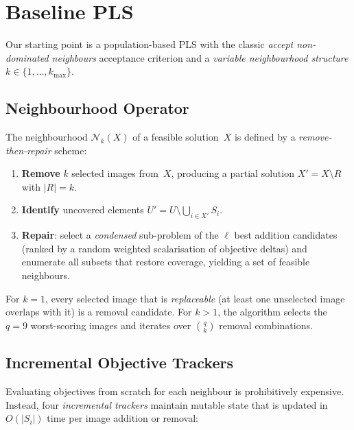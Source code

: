 \documentclass[11pt,a4paper]{article}
\newcommand{\calN}{\mathcal{N}}
\begin{document}
\section{Baseline PLS}\label{sec:pls_baseline}

Our starting point is a population-based PLS with the classic
\emph{accept non-dominated neighbours} acceptance criterion and a
\emph{variable neighbourhood structure} $k \in \{1,\ldots,k_{\max}\}$.

\subsection{Neighbourhood Operator}\label{sec:neighbourhood}

The neighbourhood $\calN_k(X)$ of a feasible solution~$X$ is defined by
a \emph{remove-then-repair} scheme:

\begin{enumerate}[nosep]
  \item \textbf{Remove} $k$ selected images from~$X$, producing a
    partial solution $X' = X \setminus R$ with $|R|=k$.
  \item \textbf{Identify} uncovered elements
    $U' = U \setminus \bigcup_{i \in X'} S_i$.
  \item \textbf{Repair}: select a \emph{condensed} sub-problem of the
    $\ell$ best addition candidates (ranked by a random weighted
    scalarisation of objective deltas) and enumerate all subsets that
    restore coverage, yielding a set of feasible neighbours.
\end{enumerate}

For $k{=}1$, every selected image that is \emph{replaceable} (at least
one unselected image overlaps with it) is a removal candidate.  For
$k{>}1$, the algorithm selects the $q{=}9$ worst-scoring images and
iterates over $\binom{q}{k}$ removal combinations.

\subsection{Incremental Objective Trackers}\label{sec:trackers}

Evaluating objectives from scratch for each neighbour is prohibitively
expensive.  Instead, four \emph{incremental trackers} maintain mutable
state that is updated in $O(|S_i|)$ time per image addition or removal:
\end{document}
